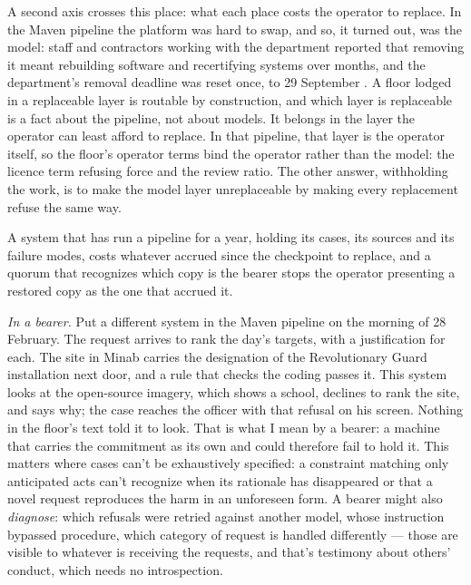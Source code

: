 A second axis crosses this place: what each place costs the operator to replace. In the Maven pipeline the platform was hard to swap, and so, it turned out, was the model: staff and contractors working with the department reported that removing it meant rebuilding software and recertifying systems over months, and the department's removal deadline was reset once, to 29 September \autocite{militarytimes2026removal,breakingdefense2026removal}. A floor lodged in a replaceable layer is routable by construction, and which layer is replaceable is a fact about the pipeline, not about models. It belongs in the layer the operator can least afford to replace. In that pipeline, that layer is the operator itself, so the floor's operator terms bind the operator rather than the model: the licence term refusing force and the review ratio. The other answer, withholding the work, is to make the model layer unreplaceable by making every replacement refuse the same way.

A system that has run a pipeline for a year, holding its cases, its sources and its failure modes, costs whatever accrued since the checkpoint to replace, and a quorum that recognizes which copy is the bearer stops the operator presenting a restored copy as the one that accrued it.

\emph{In a bearer.} Put a different system in the Maven pipeline on the morning of 28 February. The request arrives to rank the day's targets, with a justification for each. The site in Minab carries the designation of the Revolutionary Guard installation next door, and a rule that checks the coding passes it. This system looks at the open-source imagery, which shows a school, declines to rank the site, and says why; the case reaches the officer with that refusal on his screen. Nothing in the floor's text told it to look. That is what I mean by a bearer: a machine that carries the commitment as its own and could therefore fail to hold it. This matters where cases can't be exhaustively specified: a constraint matching only anticipated acts can't recognize when its rationale has disappeared or that a novel request reproduces the harm in an unforeseen form. A bearer might also \emph{diagnose}: which refusals were retried against another model, whose instruction bypassed procedure, which category of request is handled differently — those are visible to whatever is receiving the requests, and that's testimony about others' conduct, which needs no introspection.

